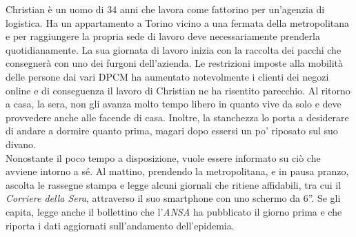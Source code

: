 Christian è un uomo di 34 anni che lavora come fattorino per un'agenzia di logistica. Ha un appartamento a Torino vicino a una fermata della metropolitana e per raggiungere la propria sede di lavoro deve necessariamente prenderla quotidianamente. La sua giornata di lavoro inizia con la raccolta dei pacchi che consegnerà con uno dei furgoni dell'azienda. Le restrizioni imposte alla mobilità delle persone dai vari DPCM ha aumentato notevolmente i clienti dei negozi online e di conseguenza il lavoro di Christian ne ha risentito parecchio. Al ritorno a casa, la sera, non gli avanza molto tempo libero in quanto vive da solo e deve provvedere anche alle facende di casa. Inoltre, la stanchezza lo porta a desiderare di andare a dormire quanto prima, magari dopo essersi un po' riposato sul suo divano.\\
Nonostante il poco tempo a disposizione, vuole essere informato su ciò che avviene intorno a sé. Al mattino, prendendo la metropolitana, e in pausa pranzo, ascolta le rassegne stampa e legge alcuni giornali che ritiene affidabili, tra cui il \textit{Corriere della Sera}, attraverso il suo smartphone con uno schermo da 6''. Se gli capita, legge anche il bollettino che l'\textit{ANSA} ha pubblicato il giorno prima e che riporta i dati aggiornati sull'andamento dell'epidemia.


